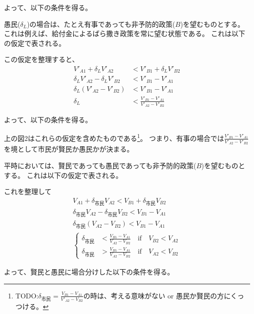 \documentclass[main.tex]{subfiles}
\begin{document}
よって、以下の条件を得る。






\bigskip
愚民($\delta_L$)の場合は、たとえ有事であっても非予防的政策($B$)を望むものとする。これは例えば、給付金によるばら撒き政策を常に望む状態である。
これは以下の仮定で表される。
 
この仮定を整理すると、
\begin{align*}
  V'_{A1} + \delta_L V'_{A2} &< V'_{B1} + \delta_L V'_{B2} \\
  \delta_L V'_{A2} - \delta_L V'_{B2} &< V'_{B1}  - V'_{A1} \\
  \delta_L (V'_{A2} - V'_{B2}) &< V'_{B1}  - V'_{A1}\\
  \delta_L &< \frac{V'_{B1}  - V'_{A1}}{V'_{A2} - V'_{B2}}
\end{align*}

よって、以下の条件を得る。

\bigskip
上の図2はこれらの仮定を含めたものである\footnote{TODO:$\delta_{市民} = \frac{V_{B1} - V_{A1}}{V'_{A2} - V_{B2}}$の時は、考える意味がない or 愚民か賢民の方にくっつける。}。
つまり、有事の場合では$\frac{V'_{B1} - V'_{A1}}{V'_{A2} - V'_{B2}}$を境として市民が賢民か愚民かが決まる。 


平時においては、賢民であっても愚民であっても非予防的政策($B$)を望むものとする。
これは以下の仮定で表される。

これを整理して
\begin{align*}
  V_{A1} + \delta_{市民} V_{A2} < V_{B1} + \delta_{市民} V_{B2} \\
  \delta_{市民} V_{A2} - \delta_{市民} V_{B2} < V_{B1} - V_{A1} \\
  \delta_{市民} (V_{A2} - V_{B2}) < V_{B1} - V_{A1} \\
  \begin{cases}
    \delta_{市民} &< \frac{V_{B1}-V_{A1}}{V_{A2} - V_{B2}} \quad\text{if}\quad V_{B2} < V_{A2}\\
    \delta_{市民} &> \frac{V_{B1}-V_{A1}}{V_{A2} - V_{B2}} \quad\text{if}\quad V_{A2} < V_{B2}
  \end{cases}
\end{align*}

よって、賢民と愚民に場合分けした以下の条件を得る。
\end{document}
